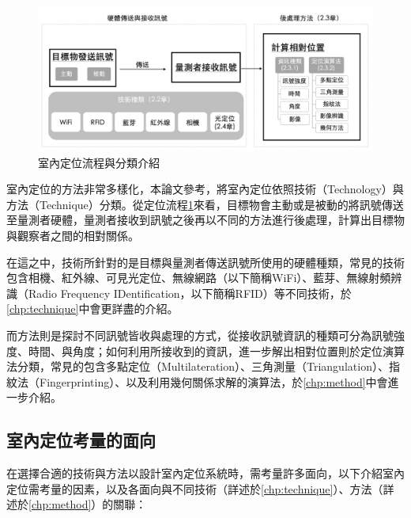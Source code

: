 \begin{figure}[ht]
    \centering
    \includegraphics[width=14cm]{ch1pic/intro_pos.png}
    \caption{室內定位流程與分類介紹}
    \label{pic:intro_pos}
\end{figure}



室內定位的方法非常多樣化，本論文參考\cite{survey_indoor2018}，將室內定位依照技術（Technology）與方法（Technique）分類。從定位流程\ref{pic:intro_pos}來看，目標物會主動或是被動的將訊號傳送至量測者硬體，量測者接收到訊號之後再以不同的方法進行後處理，計算出目標物與觀察者之間的相對關係。

在這之中，技術所針對的是目標與量測者傳送訊號所使用的硬體種類，常見的技術包含相機、紅外線、可見光定位、無線網路（以下簡稱WiFi）、藍芽、無線射頻辨識（Radio Frequency IDentification，以下簡稱RFID）等不同技術，於\ref{chp:technique}中會更詳盡的介紹。

而方法則是探討不同訊號皆收與處理的方式，從接收訊號資訊的種類可分為訊號強度、時間、與角度；如何利用所接收到的資訊，進一步解出相對位置則於定位演算法分類，常見的包含多點定位（Multilateration）、三角測量（Triangulation）、指紋法（Fingerprinting）、以及利用幾何關係求解的演算法，於\ref{chp:method}中會進一步介紹。

\subsection{室內定位考量的面向}

在選擇合適的技術與方法以設計室內定位系統時，需考量許多面向，以下介紹室內定位需考量的因素，以及各面向與不同技術（詳述於\ref{chp:technique}）、方法（詳述於\ref{chp:method}）的關聯：

